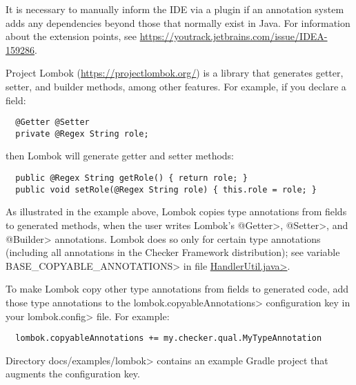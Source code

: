 It is necessary to manually inform the IDE via a plugin if an annotation
system adds any dependencies beyond those that normally exist in Java.
For information about the extension points, see
\url{https://youtrack.jetbrains.com/issue/IDEA-159286}.



Project Lombok (\url{https://projectlombok.org/}) is a library that
generates getter, setter, and builder methods, among other features.
For example, if you declare
a field:

\begin{Verbatim}
  @Getter @Setter
  private @Regex String role;
\end{Verbatim}

\noindent
then Lombok will generate getter and setter methods:

\begin{Verbatim}
  public @Regex String getRole() { return role; }
  public void setRole(@Regex String role) { this.role = role; }
\end{Verbatim}



As illustrated in the example above, Lombok copies type annotations from fields
to generated methods, when the user writes Lombok's \<@Getter>, \<@Setter>,
and \<@Builder> annotations.  Lombok does so only for certain type
annotations (including all annotations in the Checker Framework
distribution); see variable \<BASE\_COPYABLE\_ANNOTATIONS> in file
\href{https://github.com/rzwitserloot/lombok/blob/master/src/core/lombok/core/handlers/HandlerUtil.java}{\<HandlerUtil.java>}.

To make Lombok copy other type annotations from fields to generated code,
add those type annotations to the \<lombok.copyableAnnotations>
configuration key in your \<lombok.config> file.  For example:

\begin{Verbatim}
  lombok.copyableAnnotations += my.checker.qual.MyTypeAnnotation
\end{Verbatim}

Directory \<docs/examples/lombok> contains an example Gradle project that
augments the configuration key.


